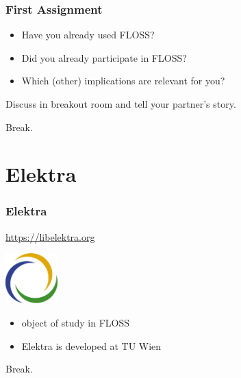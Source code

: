 \begin{assignment}
	\frametitle{First Assignment}
	\begin{itemize}[<+-| alert@+>]
		\item Have you already used FLOSS?
		\item Did you already participate in FLOSS?
		\item Which (other) implications are relevant for you?
	\end{itemize}

	\begin{task}
	Discuss in breakout room and tell your partner's story.
	\end{task}
\end{assignment}

\begin{assignment}
	\begin{task}
	Break.
	\end{task}
\end{assignment}

\section{Elektra}

\begin{frame}
	\frametitle{Elektra}

	\url{https://libelektra.org}

	\hfill \includegraphics[width=2cm]{../figures/logo}

	\vspace{-1cm}
	\begin{itemize}[<+-| alert@+>]
		\item object of study in FLOSS
		\item Elektra is developed at TU Wien
	\end{itemize}
\end{frame}

\begin{assignment}
	\begin{task}
	Break.
	\end{task}
\end{assignment}


